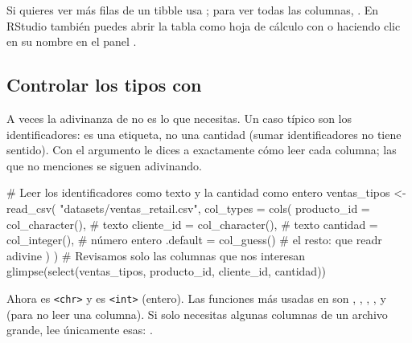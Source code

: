 \begin{consejo}
Si quieres ver más filas de un tibble usa ;
para ver todas las columnas, . En RStudio
también puedes abrir la tabla como hoja de cálculo con 
o haciendo clic en su nombre en el panel .
\end{consejo}

\subsection{Controlar los tipos con \texorpdfstring{}{col\_types}}

A veces la adivinanza de  no es lo que necesitas. Un caso
típico son los identificadores:  es una etiqueta, no una
cantidad (sumar identificadores no tiene sentido). Con el argumento
 le dices a  exactamente cómo leer cada
columna; las que no menciones se siguen adivinando.

\begin{rcode}
# Leer los identificadores como texto y la cantidad como entero
ventas_tipos <- read_csv(
  "datasets/ventas_retail.csv",
  col_types = cols(
    producto_id = col_character(),   # texto
    cliente_id  = col_character(),   # texto
    cantidad    = col_integer(),     # número entero
    .default    = col_guess()        # el resto: que readr adivine
  )
)
# Revisamos solo las columnas que nos interesan
glimpse(select(ventas_tipos, producto_id, cliente_id, cantidad))
\end{rcode}

{\sloppy Ahora  es \texttt{<chr>} y  es
\texttt{<int>} (entero). Las funciones más usadas en  son
, , ,
,  y
 (para no leer una columna). Si solo necesitas algunas
columnas de un archivo grande,  lee únicamente esas:
.\par}

